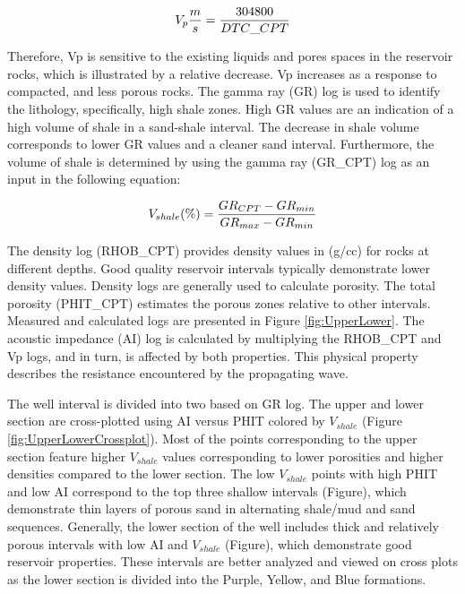 \documentclass[fleqn]{article}
\begin{document}
\begin{ceqn}
    \begin{equation} \label{eq:CompressionalVelocity}
        \centering
        V_p\frac{m}{s} = \frac{304800}{DTC\_CPT}
    \end{equation}
\end{ceqn}

Therefore, Vp is sensitive to the existing liquids and pores spaces in the reservoir rocks, which is illustrated by a relative decrease. Vp increases as a response to compacted, and less porous rocks. The gamma ray (GR) log is used to identify the lithology, specifically, high shale zones. High GR values are an indication of a high volume of shale in a sand-shale interval. The decrease in shale volume corresponds to lower GR values and a cleaner sand interval. Furthermore, the volume of shale is determined by using the gamma ray (GR\_CPT) log as an input in the following equation:

\begin{ceqn}
    \begin{equation} \label{eq:Vshale}
        \centering
        V_{shale}(\%) = \frac{GR_{CPT}-GR_{min}}{GR_{max} - GR_{min}}
    \end{equation}
\end{ceqn}

The density log (RHOB\_CPT) provides density values in (g/cc) for rocks at different depths. Good quality reservoir intervals typically demonstrate lower density values. Density logs are generally used to calculate porosity. The total porosity (PHIT\_CPT) estimates the porous zones relative to other intervals. Measured and calculated logs are presented in Figure \ref{fig:UpperLower}. The acoustic impedance (AI) log is calculated by multiplying the RHOB\_CPT and Vp logs, and in turn, is affected by both properties. This physical property describes the resistance encountered by the propagating wave.

The well interval is divided into two based on GR log. The upper and lower section are cross-plotted using AI versus PHIT colored by $V_{shale}$ (Figure \ref{fig:UpperLowerCrossplot}). Most of the points corresponding to the upper section feature higher $V_{shale}$ values corresponding to lower porosities and higher densities compared to the lower section. The low $V_{shale}$ points with high PHIT and low AI correspond to the top three shallow intervals (Figure), which demonstrate thin layers of porous sand in alternating shale/mud and sand sequences. Generally, the lower section of the well includes thick and relatively porous intervals with low AI and $V_{shale}$ (Figure), which demonstrate good reservoir properties. These intervals are better analyzed and viewed on cross plots as the lower section is divided into the Purple, Yellow, and Blue formations.
\end{document}

